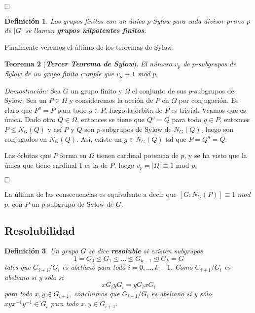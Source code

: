 \documentclass[12pt]{article}
\newtheorem{theorem}{Teorema}[section]
\newtheorem{definition}[theorem]{Definición}
\begin{document}
$\hfill \square$

\begin{definition}Los grupos finitos con un único $p$-Sylow para cada divisor primo $p$ de $|G|$ se llaman \textbf{grupos nilpotentes finitos}.
\end{definition}

Finalmente veremos el último de los teoremas de Sylow:

\begin{theorem}[\textit{\textbf{Tercer Teorema de Sylow}}]
El número $v_{p}$ de $p$-subgrupos de Sylow de un grupo finito cumple que $v_{p} \equiv 1$ mod $p$.
\end{theorem}
\emph{Demostración: }Sea $G$ un grupo finito y $\Omega$ el conjunto de sus $p$-subgrupos de Sylow. Sea un $P \in \Omega$ y consideremos la acción de $P$ en $\Omega$ por conjugación. Es claro que $P^{g}=P$ para todo $g \in P$, luego la órbita de $P$ es trivial. Veamos que es única. Dado otro $Q \in \Omega$, entonces se tiene que $Q^{g} = Q$ para todo $g \in P$, entonces $P \leq N_{G}(Q)$ y así $P$ y $Q$ son $p$-subgrupos de Sylow de $N_{G}(Q)$, luego son conjugados en $N_{G}(Q)$. Así, existe un $g \in N_{G}(Q)$ tal que $P = Q^{g}= Q$.

Las órbitas que $P$ forma en $\Omega$ tienen cardinal potencia de $p$, y se ha visto que la única que tiene cardinal $1$ es la de $P$, luego $v_{p}=|\Omega| \equiv 1$ mod $p$.

$\hfill \square$

La última de las consecuencias es equivalente a decir que $\left[ G:N_{G}(P) \right] \equiv 1$ $mod$ $p$, con $P$ un $p$-subgrupo de Sylow de $G$.

\subsection{Resolubilidad}

\begin{definition}Un grupo $G$ se dice \textbf{resoluble} si existen subgrupos $$1 = G_0 \unlhd G_1 \unlhd \ldots \unlhd G_{k-1} \unlhd G_{k} = G$$ tales que $G_{i+1}/G_i$ es abeliano para todo $i= 0, \ldots, k-1$. Como $G_{i+1}/G_i$ es abeliano si y sólo si $$xG_iyG_i = yG_ixG_i$$ para todo $x,y \in G_{i+1}$, concluimos que $G_{i+1}/G_i$ es abeliano si y sólo $xyx^{-1}y^{-1} \in G_i$ para todo $x,y \in G_{i+1}$.
\end{definition}
\end{document}
